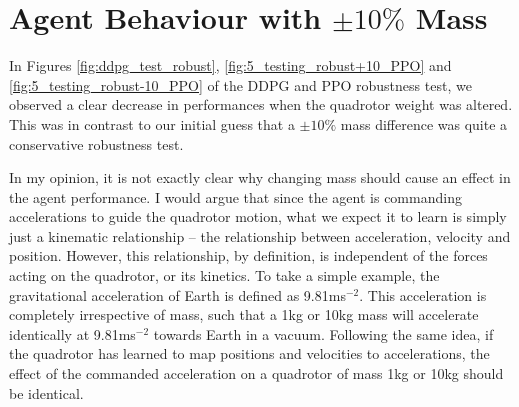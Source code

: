 \section{Agent Behaviour with $\pm10\%$ Mass}
\label{sec:6_behaviour_robustnessTest_pm10}

In Figures \ref{fig:ddpg_test_robust}, \ref{fig:5_testing_robust+10_PPO} and \ref{fig:5_testing_robust-10_PPO} of the DDPG and PPO robustness test, we observed a clear decrease in performances when the quadrotor weight was altered. This was in contrast to our initial guess that a $\pm 10\%$ mass difference was quite a conservative robustness test. 

In my opinion, it is not exactly clear why changing mass should cause an effect in the agent performance. I would argue that since the agent is commanding accelerations to guide the quadrotor motion, what we expect it to learn is simply just a kinematic relationship -- the relationship between acceleration, velocity and position. However, this relationship, by definition, is independent of the forces acting on the quadrotor, or its kinetics. To take a simple example, the gravitational acceleration of Earth is defined as 9.81ms$^{-2}$. This acceleration is completely irrespective of mass, such that a 1kg or 10kg mass will accelerate identically at 9.81ms$^{-2}$ towards Earth in a vacuum. Following the same idea, if the quadrotor has learned to map positions and velocities to accelerations, the effect of the commanded acceleration on a quadrotor of mass 1kg or 10kg should be identical. 

